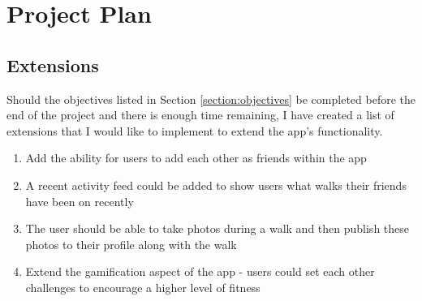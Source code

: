 \chapter{Project Plan}

\section{Extensions}

Should the objectives listed in Section \ref{section:objectives} be completed before the end of the project and there is enough time remaining, I have created a list of extensions that I would like to implement to extend the app's functionality.

\begin{enumerate}[label=\textbf{Ext \arabic*}]
  \item Add the ability for users to add each other as friends within the app
  \item A recent activity feed could be added to show users what walks their friends have been on recently
  \item The user should be able to take photos during a walk and then publish these photos to their profile along with the walk
  \item Extend the gamification aspect of the app - users could set each other challenges to encourage a higher level of fitness
\end{enumerate}